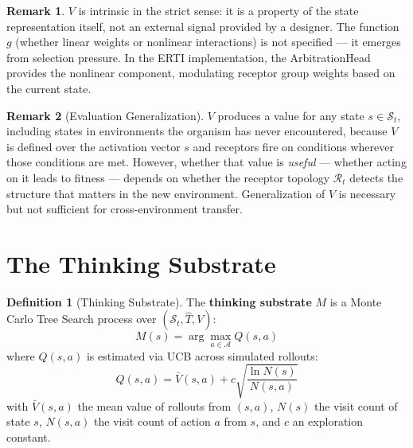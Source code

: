 \documentclass[12pt]{article}
\theoremstyle{definition}
\newtheorem{definition}{Definition}
\newtheorem{remark}{Remark}
\begin{document}
\begin{remark}
$V$ is intrinsic in the strict sense: it is a property of the state representation itself,
not an external signal provided by a designer. The function $g$ (whether linear weights
or nonlinear interactions) is not specified --- it emerges from selection pressure.
In the ERTI implementation, the ArbitrationHead provides the nonlinear component,
modulating receptor group weights based on the current state.
\end{remark}

\begin{remark}[Evaluation Generalization]
$V$ produces a value for any state $s \in \mathcal{S}_t$, including states in environments
the organism has never encountered, because $V$ is defined over the activation vector
$s$ and receptors fire on conditions wherever those conditions are met. However, whether
that value is \emph{useful} --- whether acting on it leads to fitness --- depends on
whether the receptor topology $\mathcal{R}_t$ detects the structure that matters in the
new environment. Generalization of $V$ is necessary but not sufficient for
cross-environment transfer.
\end{remark}

\section{The Thinking Substrate}

\begin{definition}[Thinking Substrate]
The \textbf{thinking substrate} $M$ is a Monte Carlo Tree Search process over $(\mathcal{S}_t, \hat{T}, V)$:
\[
M(s) = \arg\max_{a \in \mathcal{A}} Q(s, a)
\]
where $Q(s,a)$ is estimated via UCB across simulated rollouts:
\[
Q(s, a) = \bar{V}(s, a) + c \sqrt{\frac{\ln N(s)}{N(s,a)}}
\]
with $\bar{V}(s,a)$ the mean value of rollouts from $(s,a)$, $N(s)$ the visit count of
state $s$, $N(s,a)$ the visit count of action $a$ from $s$, and $c$ an exploration
constant.
\end{definition}
\end{document}
